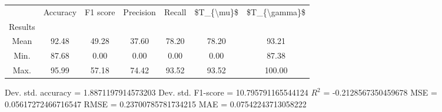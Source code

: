 \begin{tabular}{|c|c|c|c|c|c|c|}
\toprule
{} &  Accuracy &  F1 score &  Precision &  Recall &  \$T\_\{\textbackslash mu\}\$ &  \$T\_\{\textbackslash gamma\}\$ \\
Results &           &           &            &         &            &               \\
\hline
Mean    &     92.48 &     49.28 &      37.60 &   78.20 &      78.20 &         93.21 \\
Min.    &     87.68 &      0.00 &       0.00 &    0.00 &       0.00 &         87.38 \\
Max.    &     95.99 &     57.18 &      74.42 &   93.52 &      93.52 &        100.00 \\
\bottomrule
\end{tabular}

 Dev. std. accuracy = 1.8871197914573203
 Dev. std. F1-score = 10.795791165544124
 $R^2$ = -0.2128567350459678
 MSE = 0.05617272466716547
 RMSE = 0.23700785781734215
 MAE = 0.07542243713058222